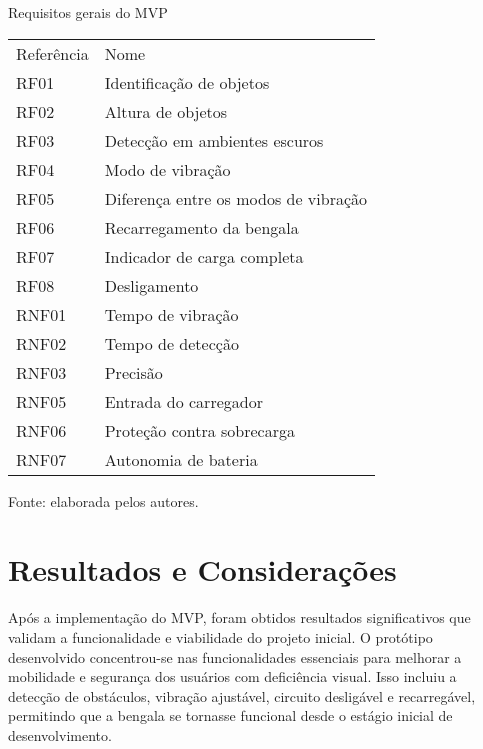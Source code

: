 \begin{quadro}[!ht]    
    \captionsetup{width=1.0\textwidth} %
    \caption{Requisitos gerais do MVP}  
    \renewcommand{\arraystretch}{1.5} %
    \begin{tabular}{p{}p{}} %
        \toprule
        Referência & Nome  \\
        RF01 & Identificação de objetos   \\
        RF02 & Altura de objetos  \\
        RF03 & Detecção em ambientes escuros    \\
        RF04 & Modo de vibração   \\
        RF05 & Diferença entre os modos de vibração \\
        RF06 & Recarregamento da bengala   \\
        RF07 & Indicador de carga completa   \\
        RF08 & Desligamento  \\
        RNF01 & Tempo de vibração  \\
        RNF02 & Tempo de detecção \\
        RNF03 & Precisão   \\
        RNF05 & Entrada do carregador  \\
        RNF06 & Proteção contra sobrecarga   \\
        RNF07 & Autonomia de bateria  \\
        \bottomrule
    \end{tabular}
    \caption*{Fonte: elaborada pelos autores.} %
\end{quadro}

\section{Resultados e Considerações}

Após a implementação do MVP, foram obtidos resultados significativos que validam a funcionalidade e viabilidade do projeto inicial. O protótipo desenvolvido concentrou-se nas funcionalidades essenciais para melhorar a mobilidade e segurança dos usuários com deficiência visual. Isso incluiu a detecção de obstáculos, vibração ajustável, circuito desligável e recarregável, permitindo que a bengala se tornasse funcional desde o estágio inicial de desenvolvimento.


